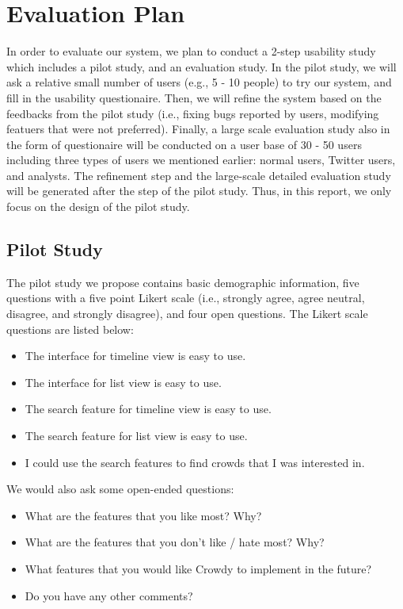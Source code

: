 \documentclass{sig-alternate}
\begin{document}
\section{Evaluation Plan}
In order to evaluate our system, we plan to conduct a 2-step usability study
which includes a pilot study, and an evaluation study. In the pilot study, we
will ask a relative small number of users (e.g., 5 - 10 people) to try our
system, and fill in the usability questionaire. Then, we will refine the system
based on the feedbacks from the pilot study (i.e., fixing bugs reported by users,
modifying featuers that were not preferred). Finally, a large scale evaluation
study also in the form of questionaire will be conducted on a user base of 30 -
50 users including three types of users we mentioned earlier: normal users, 
Twitter users, and analysts. The refinement step and the large-scale detailed
evaluation study will be generated after the step of the pilot study. Thus, in
this report, we only focus on the design of the pilot study.

\subsection{Pilot Study}

The pilot study we propose contains basic demographic information, five questions with a
five point Likert scale (i.e., strongly agree, agree
neutral, disagree, and strongly disagree), and four open questions. The
Likert scale questions are listed below:

\begin{itemize}
\item The interface for timeline view is easy to use.
\item The interface for list view is easy to use.
\item The search feature for timeline view is easy to use.
\item The search feature for list view is easy to use.
\item I could use the search features to find crowds that I was interested in.
\end{itemize}

We would also ask some open-ended questions:
\begin{itemize}
\item What are the features that you like most? Why?
\item What are the features that you don't like / hate most? Why?
\item What features that you would like Crowdy to implement in the future?
\item Do you have any other comments? 
\end{itemize}
\end{document}
